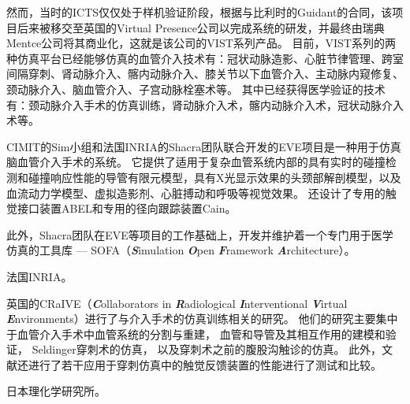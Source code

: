 然而，当时的ICTS仅仅处于样机验证阶段，根据与比利时的Guidant的合同，该项目后来被移交至英国的Virtual Presence公司以完成系统的研发，并最终由瑞典Mentce公司\cite{menticeweb}将其商业化\cite{GuidantMenticeNewsWeb}\cite{coles2011surveyCRaIVE}，这就是该公司的VIST系列产品。
目前，VIST系列的两种仿真平台已经能够仿真的血管介入技术有：冠状动脉造影、心脏节律管理、跨室间隔穿刺、肾动脉介入、髂内动脉介入、膝关节以下血管介入、主动脉内窥修复、颈动脉介入、脑血管介入、子宫动脉栓塞术等\cite{menticeweb}。
其中已经获得医学验证的技术有：颈动脉介入手术的仿真训练\cite{Dayal2004VIST}\cite{Hsu2004VIST}\cite{Nicholson2006VIST}\cite{Patel2006VIST}\cite{Cates2007VIST}\cite{VanHerzeele2009VIST}，肾动脉介入术\cite{Aggarwal2006}\cite{Glaiberman2008VIST}，髂内动脉介入术\cite{Chaer2006VIST}\cite{Berry2007VIST}\cite{VanHerzeele2008VIST}，冠状动脉介入术\cite{Gallagher2006VIST}等。

CIMIT的Sim小组\cite{medicalsimweb}和法国INRIA的Shacra团队\cite{shacraweb}联合开发的EVE项目\cite{Wu2005EVE}\cite{dequidt2007}是一种用于仿真脑血管介入手术的系统。
它提供了适用于复杂血管系统内部的具有实时的碰撞检测和碰撞响应性能的导管有限元模型\cite{Duriez2006EVE}\cite{Lenoir2006EVE}\cite{Lenoir2005EVE}\cite{Cotin2005EVE}，具有X光显示效果的头颈部解剖模型\cite{Wu2011MedicalSim}\cite{Luboz2005EVE}\cite{Muniyandi2003EVE}，以及血流动力学模型、虚拟造影剂、心脏搏动和呼吸\cite{Wu2007EVE}等视觉效果。
还设计了专用的触觉接口装置ABEL和专用的径向跟踪装置Cain\cite{medicalsimweb}。

此外，Shacra团队在EVE等项目的工作基础上，开发并维护着一个专门用于医学仿真的工具库 --- SOFA（\textbf{\textit{S}}imulation \textbf{\textit{O}}pen \textbf{\textit{F}}ramework \textbf{\textit{A}}rchitecture）\cite{Allard2007SOFA}。

法国INRIA\cite{Dequidt2008INRIA}。

英国的CRaIVE（\textbf{\textit{C}}ollaborators in \textbf{\textit{R}}adiological \textbf{\textit{I}}nterventional \textbf{\textit{V}}irtual \textbf{\textit{E}}nvironments）\cite{CRaIVEweb}进行了与介入手术的仿真训练相关的研究。
他们的研究主要集中于血管介入手术中血管系统的分割与重建\cite{Luboz2008aCRaIVE}，
血管和导管及其相互作用的建模和验证\cite{Luboz2010CRaIVE}\cite{Luboz2009aCRaIVE}\cite{Luboz2008CRaIVE}，
Seldinger穿刺术的仿真\cite{luboz2009CRaIVE}\cite{John2008CRaIVE}，
以及穿刺术之前的腹股沟触诊的仿真\cite{Coles2011CRaIVE}\cite{Coles2009CRaIVE}。
此外，文献\cite{Coles2010CRaIVE}还进行了若干应用于穿刺仿真中的触觉反馈装置的性能进行了测试和比较。

日本理化学研究所\cite{takashima2009RIKEN}\cite{takashima2007RIKEN}。

